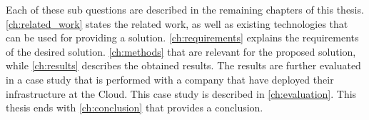\noindent
Each of these sub questions are described in the remaining chapters of this thesis. \autoref{ch:related_work} states the related work, as well as existing technologies that can be used for providing a solution. \autoref{ch:requirements} explains the requirements of the desired solution. \autoref{ch:methods} that are relevant for the proposed solution, while \autoref{ch:results} describes the obtained results. The results are further evaluated in a case study that is performed with a company that have deployed their infrastructure at the Cloud. This case study is described in \autoref{ch:evaluation}. This thesis ends with \autoref{ch:conclusion} that provides a conclusion.